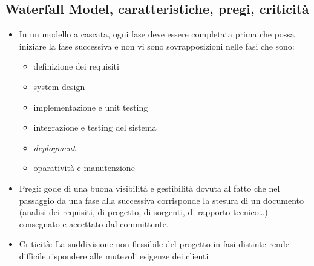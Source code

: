 \subsection{Waterfall Model, caratteristiche, pregi, criticità}
\begin{itemize}
    \item In un modello a cascata, ogni fase deve essere completata prima che possa iniziare la fase successiva e non vi sono sovrapposizioni nelle fasi che sono:
    \begin{itemize}
        \item definizione dei requisiti
        \item system design
        \item implementazione e unit testing
        \item integrazione e testing del sistema
        \item \textit{deployment}
        \item oparatività e manutenzione
    \end{itemize}
    \item Pregi: gode di una buona visibilità e gestibilità dovuta al fatto che nel passaggio da una fase alla successiva corrisponde la stesura di un documento (analisi dei requisiti, di progetto, di sorgenti, di rapporto tecnico\dots) consegnato e accettato dal committente.
    \item Criticità: La suddivisione non flessibile del progetto in fasi distinte rende difficile rispondere alle mutevoli esigenze dei clienti
\end{itemize}
